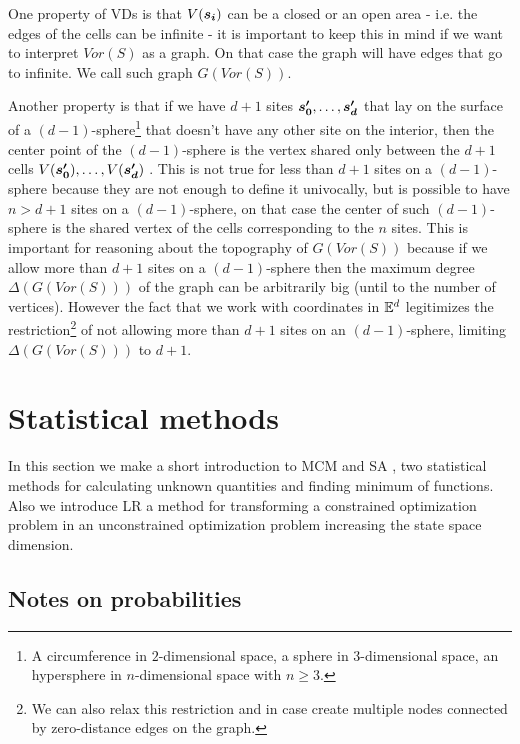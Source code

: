 \documentclass[dissertation.tex]{subfiles}
\begin{document}
One property of \acp{VD} is that $V(\boldsymbol{s_i})$ can be a closed or an
open area - i.e. the edges of the cells can be infinite - it is important
to keep this in mind if we want to interpret $Vor(S)$ as a graph. On
that case the graph will have edges that go to infinite. We call such
graph $G(Vor(S))$.

Another property is that if we have $d+1$ sites $\boldsymbol{s_0'},\dots,\boldsymbol{s_d'}$ that lay on the
surface of a $(d-1)$-sphere\footnote{A circumference in $2$-dimensional
  space, a sphere in $3$-dimensional space, an hypersphere in
  $n$-dimensional space with $n\ge 3$.} that doesn't have any other site on
the interior, then the center point of the $(d-1)$-sphere is the
vertex shared only between the $d+1$ cells
$V(\boldsymbol{s_0'}),\dots,V(\boldsymbol{s_d'})$ \cite{deberg}. This is not true for
less than
$d+1$ sites on a
$(d-1)$-sphere because they are not enough to define it univocally,
but is possible to have $n>d+1$ sites on a $(d-1)$-sphere, on that
case the center of such $(d-1)$-sphere is the shared vertex of the
cells corresponding to the $n$ sites. This is important for reasoning
about the topography of $G(Vor(S))$ because if we allow more than
$d+1$ sites on a $(d-1)$-sphere then the maximum degree
$\Delta(G(Vor(S)))$ of the graph can be arbitrarily big (until to the
number of vertices). However the fact that we work with coordinates in
$\mathbb{E}^d$ legitimizes the restriction\footnote{We can also relax this
  restriction and in case create multiple nodes connected by zero-distance
  edges on the graph.} of not
allowing more than $d+1$ sites on an $(d-1)$-sphere, limiting
$\Delta(G(Vor(S)))$ to $d+1$.

\section{Statistical methods}\label{sec:statisticalMethods}
In this section we make a short introduction to \acf{MCM}
\cite{metropolis}\cite{sobol}\cite{newman} and \acf{SA} \cite{kirkpatrick}\cite{ho},
two statistical methods for calculating unknown quantities and finding
minimum of functions. Also we introduce \acf{LR} \cite{benjamin} a
method for transforming a constrained optimization problem in an
unconstrained optimization problem increasing the state space
dimension.
\subsection{Notes on probabilities}
\end{document}
